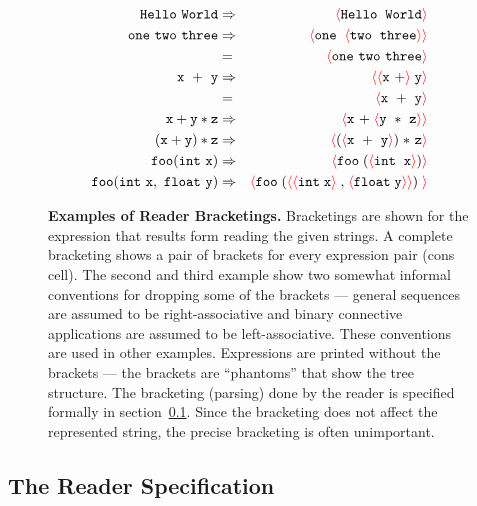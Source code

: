 \documentclass{article}
\newcommand{\fopen}{{\color{red} \langle}}
\newcommand{\fclose}{{\color{red} \rangle}}
\begin{document}
\begin{figure}
\begin{eqnarray*}
  \mathtt{Hello~World} & \Rightarrow & \fopen \mathtt{Hello}\;\; \mathtt{World}\fclose \\
  \mathtt{one~two~three} & \Rightarrow & \fopen \mathtt{one}\;\; \fopen \mathtt{two} \; \;\mathtt{three}\fclose\fclose \\
   & = & \fopen \mathtt{one~two~three} \fclose \\
  \mathtt{x~+~y} & \Rightarrow & \fopen\fopen \mathtt{x~+}\fclose\;\mathtt{y}\fclose \\
  & = & \fopen \mathtt{x~+~y} \fclose \\
  \mathtt{x+y*z} & \Rightarrow & \fopen \mathtt{x~+}\; \fopen \mathtt{y~*~z} \fclose\fclose \\
  \mathtt{(x+y)*z} & \Rightarrow & \fopen (\fopen \mathtt{x~+~y} \fclose )\;\mathtt{*~z}\fclose \\
  \mathtt{foo}(\mathtt{int~x}) & \Rightarrow & \fopen \mathtt{foo}\; (\fopen \mathtt{int}\;  \; \mathtt{x}\fclose)\fclose \\
  \mathtt{foo(int~x,~float~y)} & \Rightarrow & \fopen \mathtt{foo} \; (\fopen\fopen \mathtt{int}\; \mathtt{x} \fclose\;
  \mathtt{,}\; \fopen\mathtt{float} \; \mathtt{y} \fclose\fclose )\;\fclose
\end{eqnarray*}

\caption{{\bf Examples of Reader Bracketings.} Bracketings are shown for the expression that results form reading the given strings.
  A complete bracketing shows a pair of brackets for every expression pair (cons cell).
  The second and third example show two somewhat informal conventions for dropping some of the brackets --- general sequences are
  assumed to be right-associative and binary connective applications are assumed to be left-associative.  These conventions are used in other examples.
  Expressions are printed without the brackets --- the brackets are ``phantoms'' that show the tree structure.   The bracketing (parsing) done by the reader
  is specified formally in section~\ref{sec:reader}. Since the bracketing does not affect the represented string, the precise bracketing is often unimportant.}
\label{fig:reader}
\end{figure}


\subsection{The Reader Specification}
\label{sec:reader}
\end{document}
